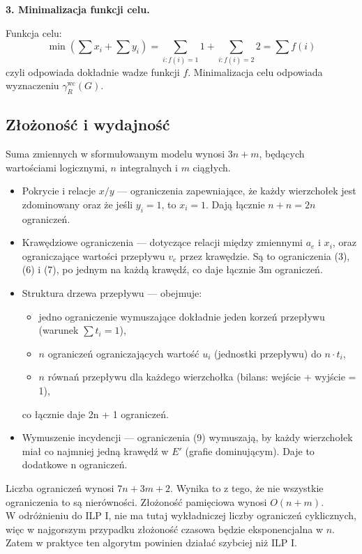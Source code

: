 \textbf{3. Minimalizacja funkcji celu.}

Funkcja celu:
\[
\min \left( \sum x_i + \sum y_i \right) = \sum_{i : f(i) = 1} 1 + \sum_{i : f(i) = 2} 2 = \sum f(i)
\]
czyli odpowiada dokładnie wadze funkcji \( f \). Minimalizacja celu odpowiada wyznaczeniu \( \gamma^{\text{wc}}_R(G) \).

\subsection{Złożoność i wydajność}

Suma zmiennych w sformułowanym modelu wynosi $3n + m$, będących wartościami logicznymi, $n$ integralnych i $m$ ciągłych.
\begin{itemize}
    \item Pokrycie i relacje \( x/y \) — ograniczenia zapewniające, że każdy wierzchołek jest zdominowany oraz że jeśli \( y_i = 1 \), to \( x_i = 1 \). Dają łącznie \( n + n = 2n \) ograniczeń.
    
    \item Krawędziowe ograniczenia — dotyczące relacji między zmiennymi \( a_e \) i \( x_i \), oraz ograniczające wartości przepływu \( v_e \) przez krawędzie. Są to ograniczenia (3), (6) i (7), po jednym na każdą krawędź, co daje łącznie 3m ograniczeń.
    
    \item Struktura drzewa przepływu — obejmuje:
    \begin{itemize}
        \item jedno ograniczenie wymuszające dokładnie jeden korzeń przepływu (warunek \( \sum t_i = 1 \)),
        \item \( n \) ograniczeń ograniczających wartość \( u_i \) (jednostki przepływu) do \( n \cdot t_i \),
        \item \( n \) równań przepływu dla każdego wierzchołka (bilans: wejście + wyjście = 1),
    \end{itemize}
    co łącznie daje 2n + 1 ograniczeń.
    
    \item Wymuszenie incydencji — ograniczenia (9) wymuszają, by każdy wierzchołek miał co najmniej jedną krawędź w \( E' \) (grafie dominującym). Daje to dodatkowe n ograniczeń.
\end{itemize}

\noindent
Liczba ograniczeń wynosi $7n+3m+2$. Wynika to z tego, że nie wszystkie ograniczenia to są nierówności.
Złożoność pamięciowa wynosi $O(n+m)$.\\
W odróżnieniu do ILP I, nie ma tutaj wykładniczej liczby ograniczeń cyklicznych, więc w najgorszym przypadku złożoność czasowa będzie eksponencjalna w $n$. Zatem w praktyce ten algorytm powinien działać szybciej niż ILP I.

